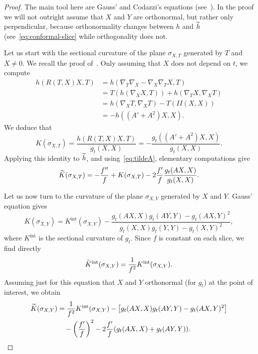 \documentclass[AHL,Unicode,longabstracts,published]{cedram}
\DeclareMathOperator{\intt}{int}
\theoremstyle{plain}
\let\oldtilde\tilde
\renewcommand*{\tilde}[1]{\mathchoice{\widetilde{#1}}{\widetilde{#1}}{\oldtilde{#1}}{\oldtilde{#1}}}
\begin{document}
\begin{proof}
The main tool here are Gauss' and Codazzi's equations (see~\cite[Section~6.3]{DoCarmo}). In the proof we will not outright assume that $X$ and $Y$ are orthonormal, but rather only perpendicular, because orthonormality changes between $h$ and $\tilde{h}$ (see~\eqref{eq:conformal-slice} while orthogonality does not.

Let us start with the sectional curvature of the plane $\sigma_{X,T}$ generated by $T$ and $X\neq 0$. We recall the proof of~\cite[Eq.~2.7]{Chen-Erchenko-Gogolev}. Only assuming that $X$ does not depend on $t$, we compute
\begin{align*}
h(R(T,X)X, T) &= h(\nabla_T \nabla_X-\nabla_X \nabla_T X, T) \\
& = T(h(\nabla_X X,T)) + h(\nabla_T X, \nabla_X T) \\
& = h(\nabla_X T, \nabla_X T) - T(II(X,X)) \\
&= - h((A'+A^2)X,X).
\end{align*}
We deduce that
\[
K(\sigma_{X,T}) = \frac{h(R(T,X)X,T)}{g_t(X,X)}= - \frac{g_t((A'+A^2)X,X)}{g_t(X,X)}.
\]
Applying this identity to $\tilde{h}$, and using~\eqref{eq:tildeA}, elementary computations give
\[
\tilde{K}(\sigma_{X,T}) = - \frac{f''}{f} + K(\sigma_{X,T}) - 2 \frac{f'}{f} \frac{g_t(AX,X)}{g_t(X,X)}.
\]


Let us now turn to the curvature of the plane $\sigma_{X,Y}$ generated by $X$ and $Y$. Gauss' equation gives
\[
K(\sigma_{X,Y}) = K^{\intt}(\sigma_{X,Y}) - \frac{ g_t(AX,X)g_t(AY,Y) - g_t(AX,Y)^2}{g_t(X,X)g_t(Y,Y) - g_t(X,Y)^2},
\]
where $K^{\intt}$ is the sectional curvature of $g_t$. Since $f$ is constant on each slice, we find directly
\[
\tilde{K}^{\intt}(\sigma_{X,Y}) = \frac{1}{f^2} K^{\intt}(\sigma_{X,Y}).
\]
Assuming just for this equation that $X$ and $Y$ orthonormal (for $g_t$) at the point of interest, we obtain
\[
\begin{split}
\tilde{K}(\sigma_{X,Y}) &= \frac{1}{f^2} K^{\intt}(\sigma_{X,Y}) - \left[g_t(AX,X)g_t(AY,Y) - g_t(AX,Y)^2\right] \\
&\quad - \left(\frac{f'}{f}\right)^2 - 2 \frac{f'}{f}(g_t(AX,X) + g_t(AY,Y)).
\end{split}
\]


\end{proof}
\end{document}
